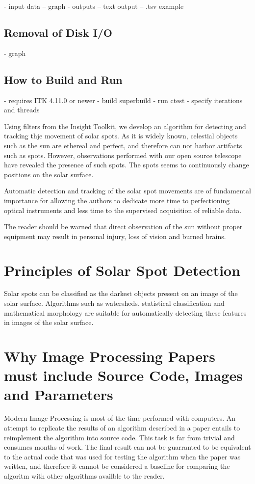 \documentclass{InsightArticle}
\begin{document}
- input data
-- graph
- outputs
-- text output
-- .tsv example

\subsection{Removal of Disk I/O}
- graph

\subsection{How to Build and Run}
- requires ITK 4.11.0 or newer
- build superbuild
- run ctest
- specify iterations and threads



Using filters from the Insight Toolkit, we develop an algorithm for detecting
and tracking thje movement of solar spots. As it is widely known, celestial
objects such as the sun are ethereal and perfect, and therefore can not harbor
artifacts such as spots. However, observations performed with our open source
telescope have revealed the presence of such spots. The spots seems to continuously change positions on the solar surface.

Automatic detection and tracking of the solar spot movements are of fundamental
importance for allowing the authors to dedicate more time to perfectioning
optical instruments and less time to the supervised acquisition of reliable
data.

The reader should be warned that direct observation of the sun without proper
equipment may result in personal injury, loss of vision and burned brains.

\section{Principles of Solar Spot Detection}

Solar spots can be classified as the darkest objects present on an image of the
solar surface. Algorithms such as watersheds, statistical classification and
mathematical morphology are suitable for automatically detecting these features
in images of the solar surface.


\section{Why Image Processing Papers must include Source Code, Images and Parameters }

Modern Image Processing is most of the time performed with computers. An
attempt to replicate the results of an algorithm described in a paper entails
to reimplement the algorithm into source code. This task is far from trivial
and consumes months of work. The final result can not be guarranted to be
equivalent to the actual code that was used for testing the algorithm when the
paper was written, and therefore it cannot be considered a baseline for
comparing the algoritm with other algorithms availble to the reader.
\end{document}
